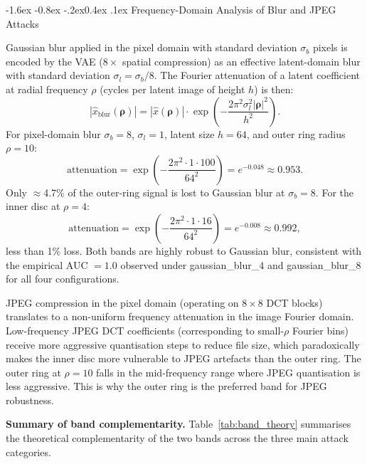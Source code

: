 \documentclass[10pt,twocolumn]{article}
\makeatletter
\renewcommand\subsection{\@startsection{subsection}{2}{\z@}%
  {-1.6ex \@plus -0.8ex \@minus -.2ex}{0.4ex \@plus .1ex}%
  {\normalfont\normalsize\itshape}}
\makeatother
\begin{document}
\subsection{Frequency-Domain Analysis of Blur and JPEG Attacks}

Gaussian blur applied in the pixel domain with standard deviation
$\sigma_b$ pixels is encoded by the VAE ($8\times$ spatial compression)
as an effective latent-domain blur with standard deviation
$\sigma_l = \sigma_b/8$.
The Fourier attenuation of a latent coefficient at radial frequency
$\rho$ (cycles per latent image of height $h$) is then:
\begin{equation}
  |\hat{x}_{\mathrm{blur}}(\boldsymbol{\rho})|
    = |\hat{x}(\boldsymbol{\rho})|
      \cdot \exp\!\left(-\frac{2\pi^2\sigma_l^2|\boldsymbol{\rho}|^2}{h^2}\right).
  \label{eq:blur_fourier}
\end{equation}
For pixel-domain blur $\sigma_b{=}8$, $\sigma_l{=}1$, latent size $h{=}64$,
and outer ring radius $\rho{=}10$:
\begin{equation}
  \text{attenuation} = \exp\!\left(-\frac{2\pi^2 \cdot 1 \cdot 100}{64^2}\right)
    = e^{-0.048} \approx 0.953.
\end{equation}
Only $\approx$4.7\% of the outer-ring signal is lost to Gaussian blur
at $\sigma_b{=}8$.
For the inner disc at $\rho{=}4$:
\begin{equation}
  \text{attenuation} = \exp\!\left(-\frac{2\pi^2 \cdot 1 \cdot 16}{64^2}\right)
    = e^{-0.008} \approx 0.992,
\end{equation}
less than 1\% loss. Both bands are highly robust to Gaussian blur,
consistent with the empirical AUC $= 1.0$ observed under gaussian\_blur\_4
and gaussian\_blur\_8 for all four configurations.

JPEG compression in the pixel domain (operating on $8\times8$ DCT
blocks) translates to a non-uniform frequency attenuation in the
image Fourier domain.
Low-frequency JPEG DCT coefficients (corresponding to small-$\rho$
Fourier bins) receive more aggressive quantisation steps to reduce
file size, which paradoxically makes the inner disc more vulnerable
to JPEG artefacts than the outer ring.
The outer ring at $\rho = 10$ falls in the mid-frequency range
where JPEG quantisation is less aggressive.
This is why the outer ring is the preferred band for JPEG robustness.

\textbf{Summary of band complementarity.}
Table~\ref{tab:band_theory} summarises the theoretical complementarity
of the two bands across the three main attack categories.
\end{document}
